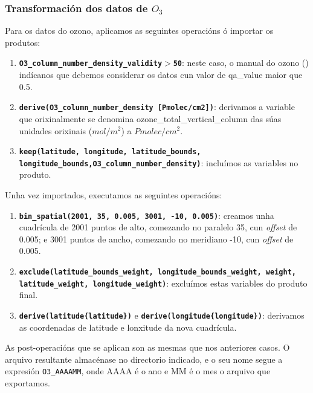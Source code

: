 \subsubsection{Transformación dos datos de $O_3$}
Para os datos do ozono, aplicamos as seguintes operacións ó importar os produtos:
\begin{enumerate}
    \item \texttt{\textbf{O3\_column\_number\_density\_validity$>$50}}: neste caso, o manual do ozono (\cite{O3manual}) indícanos que debemos considerar os datos cun
    valor de qa\_value maior que 0.5.
    \item \texttt{\textbf{derive(O3\_column\_number\_density [Pmolec/cm2])}}: derivamos a variable que orixinalmente se denomina ozone\_total\_vertical\_column das súas
    unidades orixinais ($mol/m^2$) a $Pmolec/cm^2$.
    \item \texttt{\textbf{keep(latitude, longitude, latitude\_bounds, longitude\_bounds,\break O3\_column\_number\_density)}}: incluímos as variables no produto.
\end{enumerate}

Unha vez importados, executamos as seguintes operacións:
\begin{enumerate}
    \item \texttt{\textbf{bin\_spatial(2001, 35, 0.005, 3001, -10, 0.005)}}: creamos unha cuadrícula de 2001 puntos de alto, comezando no paralelo 35\textdegree, cun \textit{offset} de 0.005\textdegree;
    e 3001 puntos de ancho, comezando no meridiano -10\textdegree, cun \textit{offset} de 0.005.
    \item \texttt{\textbf{exclude(latitude\_bounds\_weight, longitude\_bounds\_weight, weight, latitude\_weight, longitude\_weight)}}: excluímos estas variables do produto final.
    \item \texttt{\textbf{derive(latitude\{latitude\})}} e  \texttt{\textbf{derive(longitude\{longitude\})}}: derivamos as coordenadas de latitude e lonxitude da nova cuadrícula.
\end{enumerate}

As post-operacións que se aplican son as mesmas que nos anteriores casos. O arquivo resultante almacénase no directorio indicado, e o seu nome segue a expresión \texttt{O3\_AAAAMM},
onde AAAA é o ano e MM é o mes o arquivo que exportamos.


